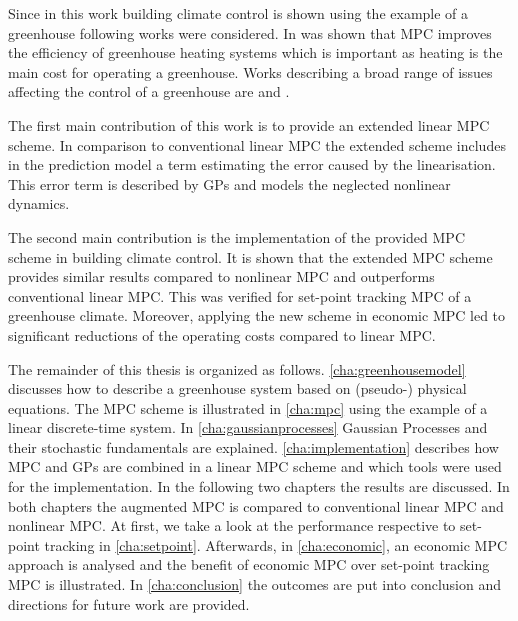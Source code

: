 Since in this work building climate control is shown using the example of a greenhouse following works were considered.
In \cite{RamirezArias.2005} was shown that MPC improves the efficiency of greenhouse heating systems which is important as heating is the main cost for operating a greenhouse.
Works describing a broad range of issues affecting the control of a greenhouse are \cite{Rodriguez.2015} and \cite{Bakker.1995}.\par\medskip


The first main contribution of this work is to provide an extended linear MPC scheme.
In comparison to conventional linear MPC the extended scheme includes in the prediction model a term estimating the error caused by the linearisation.
This error term is described by GPs and models the neglected nonlinear dynamics.

The second main contribution is the implementation of the provided MPC scheme in building climate control.
It is shown that the extended MPC scheme provides similar results compared to nonlinear MPC and outperforms conventional linear MPC.
This was verified for set-point tracking MPC of a greenhouse climate.
Moreover, applying the new scheme in economic MPC led to significant reductions of the operating costs compared to linear MPC.\par\medskip


The remainder of this thesis is organized as follows.
\cref{cha:greenhousemodel} discusses how to describe a greenhouse system based on (pseudo-) physical equations.
The MPC scheme is illustrated in \cref{cha:mpc} using the example of a linear discrete-time system.
In \cref{cha:gaussianprocesses} Gaussian Processes and their stochastic fundamentals are explained.
\cref{cha:implementation} describes how MPC and GPs are combined in a linear MPC scheme and which tools were used for the implementation.
In the following two chapters the results are discussed.
In both chapters the augmented MPC is compared to conventional linear MPC and nonlinear MPC.
At first, we take a look at the performance respective to set-point tracking in \cref{cha:setpoint}.
Afterwards, in \cref{cha:economic}, an economic MPC approach is analysed and the benefit of economic MPC over set-point tracking MPC is illustrated.
In \cref{cha:conclusion} the outcomes are put into conclusion and directions for future work are provided.